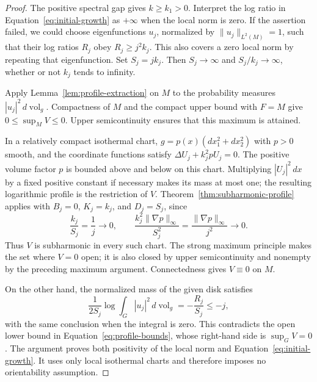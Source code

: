 \begin{proof}
The positive spectral gap gives $k\ge k_1>0$.  Interpret the log
ratio in Equation~\eqref{eq:initial-growth} as $+\infty$ when the
local norm is zero.  If the assertion failed, we could choose
eigenfunctions $u_j$, normalized by $\|u_j\|_{L^2(M)}=1$, such
that their log ratios $R_j$ obey $R_j\ge j^2 k_j$.  This also
covers a zero local norm by repeating that eigenfunction.  Set
$S_j=j k_j$.  Then $S_j\to\infty$ and $S_j/k_j\to\infty$,
whether or not $k_j$ tends to infinity.

Apply Lemma~\ref{lem:profile-extraction} on $M$ to the probability
measures $|u_j|^2\,d\operatorname{vol}_g$.  Compactness of $M$ and
the compact upper bound with $F=M$ give
$0\le\sup_M V\le0$.  Upper semicontinuity ensures that this
maximum is attained.

In a relatively compact isothermal chart,
$g=p(x)(dx_1^2+dx_2^2)$ with $p>0$ smooth, and the coordinate
functions satisfy $\Delta U_j+k_j^2pU_j=0$.  The positive
volume factor $p$ is bounded above and below on this chart.
Multiplying $|U_j|^2\,dx$ by a fixed positive constant if
necessary makes its mass at most one; the resulting logarithmic
profile is the restriction of $V$.  Theorem~\ref{thm:subharmonic-profile}
applies with $B_j=0$, $K_j=k_j$, and $D_j=S_j$, since
\[
 \frac{k_j}{S_j}=\frac1j\longrightarrow0,
 \qquad
 \frac{k_j^2\|\nabla p\|_\infty}{S_j^2}
       =\frac{\|\nabla p\|_\infty}{j^2}\longrightarrow0.
\]
Thus $V$ is subharmonic in every such chart.  The strong maximum
principle makes the set where $V=0$ open; it is also closed by
upper semicontinuity and nonempty by the preceding maximum
argument.  Connectedness gives $V\equiv0$ on $M$.

On the other hand, the normalized mass of the given disk satisfies
\[
 \frac{1}{2S_j}\log\int_G |u_j|^2\,d\operatorname{vol}_g
   =-\frac{R_j}{S_j}\le-j,
\]
with the same conclusion when the integral is zero.  This
contradicts the open lower bound in
Equation~\eqref{eq:profile-bounds}, whose right-hand side is
$\sup_GV=0$.  The argument proves both positivity of the local
norm and Equation~\eqref{eq:initial-growth}.  It uses only local
isothermal charts and therefore imposes no orientability
assumption.
\end{proof}
